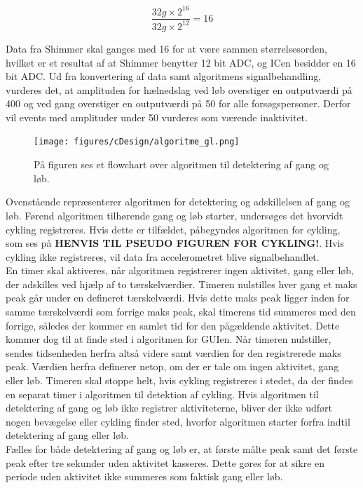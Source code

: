 \begin{equation}
\frac{32 g \times 2^{16}}{32 g \times 2^{12}} = 16
\label{eq:bitsammenhaeng}
\end{equation}

Data fra Shimmer skal ganges med 16 for at være sammen størrelsesorden, hvilket er et resultat af at Shimmer benytter 12 bit ADC, og ICen besidder en 16 bit ADC. Ud fra konvertering af data samt algoritmens signalbehandling, vurderes det, at amplituden for hælnedslag ved løb overstiger en outputværdi på 400 og ved gang overstiger en outputværdi på 50 for alle forsøgspersoner. Derfor vil events med amplituder under 50 vurderes som værende inaktivitet.
\begin{figure}[H]
	\centering
	\texttt{[image: figures/cDesign/algoritme\_gl.png]}
	\caption{På figuren ses et flowchart over algoritmen til detektering af gang og løb.}
	\label{fig:algoritme}
\end{figure}
Ovenstående  repræsenterer algoritmen for detektering og adskillelsen af gang og løb. Førend algoritmen tilhørende gang og løb starter, undersøges det hvorvidt cykling registreres. Hvis dette er tilfældet, påbegyndes algoritmen for cykling, som ses på \textbf{HENVIS TIL PSEUDO FIGUREN FOR CYKLING!}. Hvis cykling ikke registreres, vil data fra accelerometret blive signalbehandlet. \\
En timer skal aktiveres, når algoritmen registrerer ingen aktivitet, gang eller løb, der adskilles ved hjælp af to tærskelværdier. Timeren nulstilles hver gang et maks peak går under en defineret tærskelværdi. Hvis dette maks peak ligger inden for samme tærskelværdi som forrige maks peak, skal timerens tid summeres med den forrige, således der kommer en samlet tid for den pågældende aktivitet. Dette kommer dog til at finde sted i algoritmen for GUIen. Når timeren nulstiller, sendes tidsenheden herfra altså videre samt værdien for den registrerede maks peak. Værdien herfra definerer netop, om der er tale om ingen aktivitet, gang eller løb. Timeren skal stoppe helt, hvis cykling registreres i stedet, da der findes en separat timer i algoritmen til detektion af cykling. %
Hvis algoritmen til detektering af gang og løb ikke registrer aktiviteterne, bliver der ikke udført nogen bevægelse eller cykling finder sted, hvorfor algoritmen starter forfra indtil detektering af gang eller løb. \\
Fælles for både detektering af gang og løb er, at første målte peak samt det første peak efter tre sekunder uden aktivitet kasseres. Dette gøres for at sikre en periode uden aktivitet ikke summeres som faktisk gang eller løb.

